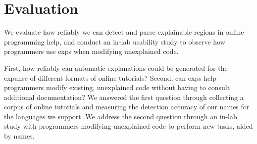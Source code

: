\section{Evaluation}

\begin{changes}
We evaluate how reliably we can detect and parse explainable regions in online programming help, and conduct an in-lab usability study to observe how programmers use \glspl{exp} when modifying unexplained code.
\end{changes}
First, how reliably can automatic explanations could be generated for the expanse of different formats of online tutorials?
Second, can \glspl{exp} help programmers modify existing, unexplained code without having to consult additional documentation?
We answered the first question through collecting a corpus of online tutorials and measuring the detection accuracy of our \glspl{name} for the languages we support.
We address the second question through an in-lab study with programmers modifying unexplained code to perform new tasks, aided by \glspl{name}.
\fi
%
